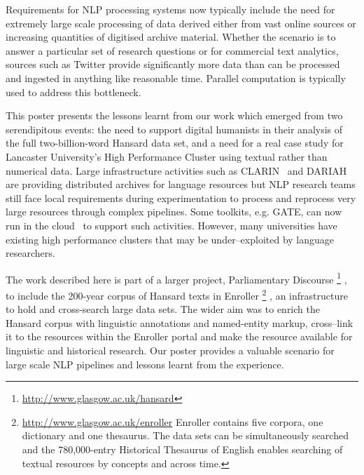 Requirements for NLP processing systems now typically include the need for extremely large scale processing of data derived either from vast online sources or increasing quantities of digitised archive material. 
Whether the scenario is to answer a particular set of research questions or for commercial text analytics, sources such as Twitter provide significantly more data than can be processed and ingested in anything like reasonable time. Parallel computation is typically used to address this bottleneck.

This poster presents the lessons learnt from our work which emerged from two serendipitous events: the need to support digital humanists in their analysis of the full two-billion-word Hansard data set, and a need for a real case study for Lancaster University's High Performance Cluster using textual rather than numerical data. 
Large infrastructure activities such as CLARIN~\cite{varadi2008clarin} and DARIAH~\cite{constantopoulos2008preparing} are providing distributed archives for language resources but NLP research teams still face local requirements during experimentation to process and reprocess very large resources through complex pipelines. 
Some toolkits, e.g. GATE, can now run in the cloud~\cite{tablan2013gatecloud} to support such activities. However, many universities have existing high performance clusters that may be under--exploited by language researchers.  

The work described here is part of a larger project, Parliamentary Discourse%
\footnote{\url{http://www.glasgow.ac.uk/hansard}}%
, to include the 200-year corpus of Hansard texts in Enroller%
\footnote{\url{http://www.glasgow.ac.uk/enroller} Enroller contains five corpora, one dictionary and one thesaurus. The data sets can be simultaneously searched and the 780,000-entry Historical Thesaurus of English enables searching of textual resources by concepts and across time.}%
, an infrastructure to hold and cross-search large data sets. The wider aim was to enrich the Hansard corpus with linguistic annotations and named-entity markup, cross--link it to the resources within the Enroller portal and make the resource available for linguistic and historical research. 
Our poster provides a valuable scenario for large scale NLP pipelines and lessons learnt from the experience.
